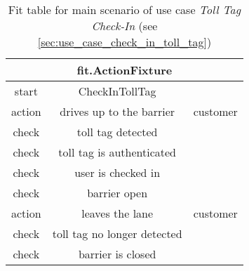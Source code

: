 
\begin{table}
\begin{centering}
\begin{tabular}{|c|c|c||c||c||c||c||c||c||c||c||c||c||c|}
\hline 
\multicolumn{14}{|c|}{fit.ActionFixture}\tabularnewline
\hline 
start & CheckInTollTag & \multicolumn{12}{c|}{}\tabularnewline
\hline 
action & drives up to the barrier & \multicolumn{12}{c|}{customer}\tabularnewline
\hline 
check & toll tag detected & \multicolumn{12}{c|}{}\tabularnewline
\hline 
check & toll tag is authenticated & \multicolumn{12}{c|}{}\tabularnewline
\hline 
check & user is checked in & \multicolumn{12}{c|}{}\tabularnewline
\hline 
check & barrier open & \multicolumn{12}{c|}{}\tabularnewline
\hline 
action & leaves the lane & \multicolumn{12}{c|}{customer}\tabularnewline
\hline 
check & toll tag no longer detected & \multicolumn{12}{c|}{}\tabularnewline
\hline 
check & barrier is closed & \multicolumn{12}{c|}{}\tabularnewline
\hline 
\end{tabular}
\par\end{centering}

\caption{Fit table for main scenario of use case \emph{Toll Tag Check-In} (see \autoref{sec:use_case_check_in_toll_tag})}
\end{table}


